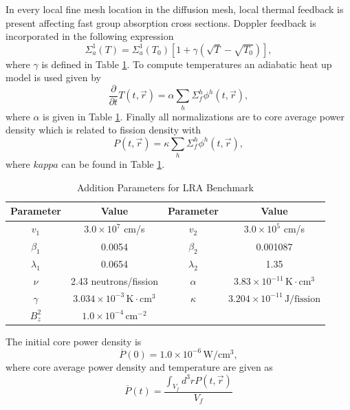 \documentclass{ansconf}
\numberwithin{equation}{section}
\begin{document}
In every local fine mesh location in the diffusion mesh, local thermal feedback is present affecting fast group absorption cross sections. Doppler feedback is incorporated in the following expression
\begin{equation}\label{eq:LRA_xstemp}
    \Sigma_a^1\left(T\right) = \Sigma_a^1\left(T_0\right)\left[1 + \gamma\left(\sqrt{T} - \sqrt{T_0}\right)\right],
\end{equation}
where $\gamma$ is defined in Table \ref{tab:LRA_params}. To compute temperatures an adiabatic heat up model is used given by
\begin{equation}\label{eq:Temp}
    \frac{\partial}{\partial t} T\left(t,\vec{r}\right) = \alpha\sum_h\Sigma_f^h\phi^h\left(t,\vec{r}\right),
\end{equation}
where $\alpha$ is given in Table \ref{tab:LRA_params}. Finally all normalizations are to core average power density which is related to fission density with
\begin{equation}\label{eq:Pdens}
    P\left(t,\vec{r}\right) = \kappa\sum_h\Sigma_f^h\phi^h\left(t,\vec{r}\right),
\end{equation}
where $kappa$ can be found in Table \ref{tab:LRA_params}. 
\begin{table}
\centering
\caption{Addition Parameters for LRA Benchmark}
\label{tab:LRA_params}
\begin{tabular}{cc||cc}
\toprule 
Parameter & Value & Parameter & Value\tabularnewline
\midrule
\midrule 
$v_{1}$ & $3.0\times10^{7}$ cm/s & $v_{2}$ & $3.0\times10^{5}$ cm/s\tabularnewline
\midrule 
$\beta_{1}$ & 0.0054 & $\beta_{2}$ & 0.001087\tabularnewline
\midrule 
$\lambda_{1}$ & 0.0654 & $\lambda_{2}$ & 1.35\tabularnewline
\midrule 
$\nu$ & 2.43 neutrons/fission & $\alpha$ & $3.83\times10^{-11}\,\mathrm{K\cdot cm^{3}}$\tabularnewline
\midrule 
$\gamma$  & $3.034\times10^{-3}\,\mathrm{K\cdot cm^{3}}$ & $\kappa$  & $3.204\times10^{-11}\,\mathrm{J/fission}$\tabularnewline
\midrule 
$B_{z}^{2}$ & $1.0\times10^{-4}\,\mathrm{cm^{-2}}$ &  & \tabularnewline
\bottomrule
\end{tabular}
\end{table}
The initial core power density is
\begin{equation}
    \overline{P}\left(0\right) = 1.0 \times 10^{-6}\,\mathrm{W/cm^3},
\end{equation}
where core average power density and temperature are given as
\begin{equation}\label{eq:aveP}
    \overline{P}\left(t\right) = \frac{\int_{V_f}d^3rP\left(t,\vec{r}\right)}{V_f}
\end{equation}
\end{document}
